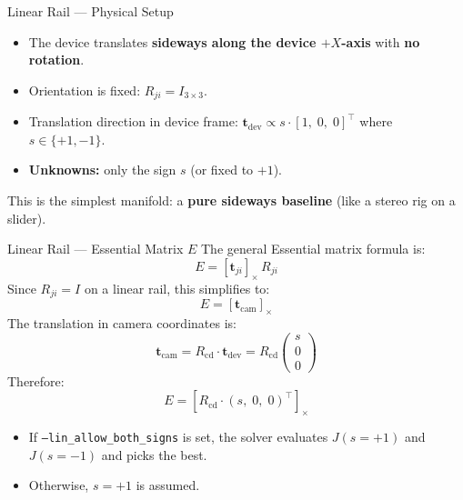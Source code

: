 \documentclass[aspectratio=169, 12pt]{beamer}
\newcommand{\Rcd}{R_{\mathrm{cd}}}
\newcommand{\skewmat}[1]{\left[#1\right]_{\times}}
\begin{document}
\begin{frame}{Linear Rail --- Physical Setup}
\small
\begin{itemize}\setlength{\itemsep}{2pt}
    \item The device translates \textbf{sideways along the device $+X$-axis} with \textbf{no rotation}.
    \item Orientation is fixed: $R_{ji} = I_{3\times 3}$.
    \item Translation direction in device frame:
          $\mathbf{t}_{\mathrm{dev}} \propto s \cdot [1,\; 0,\; 0]^\top$
          where $s \in \{+1, -1\}$.
    \item \textbf{Unknowns:} only the sign $s$ (or fixed to $+1$).
\end{itemize}

\begin{center}
\end{center}

\medskip
This is the simplest manifold: a \textbf{pure sideways baseline} (like a stereo rig on a slider).
\end{frame}

\begin{frame}{Linear Rail --- Essential Matrix $E$}
\small
The general Essential matrix formula is:
\vspace{-0.3em}
\[
    E = \skewmat{\mathbf{t}_{ji}} \, R_{ji}
\]
\vspace{-0.8em}
Since $R_{ji} = I$ on a linear rail, this simplifies to:
\vspace{-0.3em}
\[
    E = \skewmat{\mathbf{t}_{\mathrm{cam}}}
\]
\vspace{-0.8em}
The translation in camera coordinates is:
\vspace{-0.3em}
\[
    \mathbf{t}_{\mathrm{cam}} = \Rcd \cdot \mathbf{t}_{\mathrm{dev}}
    = \Rcd \begin{pmatrix} s \\ 0 \\ 0 \end{pmatrix}
\]
\vspace{-0.5em}
Therefore:
\vspace{-0.3em}
\[
    \boxed{E = \skewmat{\Rcd \cdot (s,\; 0,\; 0)^\top}}
\]
\vspace{-0.3em}
\begin{itemize}\setlength{\itemsep}{2pt}
    \item If \texttt{--lin\_allow\_both\_signs} is set, the solver evaluates
          $J(s{=}+1)$ and $J(s{=}-1)$ and picks the best.
    \item Otherwise, $s=+1$ is assumed.
\end{itemize}
\end{frame}
\end{document}
